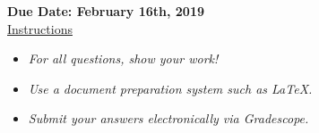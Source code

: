 \documentclass[12pt]{article}
\theoremstyle{definition}
\begin{document}
\fancyhead{}
\fancyfoot{}


\vspace{1cm}

{\bf Due Date: February 16th, 2019}\\

\vspace{-0.5cm}
\underline{Instructions}
\renewcommand{\labelitemi}{\textbullet}
\begin{itemize}
\item \emph{For all questions, show your work!}
\item \emph{Use a document preparation system such as LaTeX.}
\item \emph{Submit your answers electronically via Gradescope.}
\end{itemize}









\end{document}
